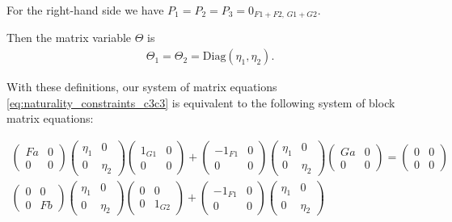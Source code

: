 \begin{example}
For the right-hand side we have $P_{1} = P_{2} = P_{3} = 0_{F1+F2,\,G1+G2}$.

Then the matrix variable $\Theta$ is
\begin{align*}
\Theta_{1} = \Theta_{2} = \mathrm{Diag}(\eta_{1}, \eta_{2}).
\end{align*}

With these definitions, our system of matrix equations \eqref{eq:naturality_constraints_c3c3} is equivalent to the following system of
block matrix equations:

\begin{subequations}
\begin{align}
\begin{pmatrix} Fa & 0 \\ 0 & 0 \end{pmatrix} \begin{pmatrix} \eta_{1} & 0 \\ 0 & \eta_{2} \end{pmatrix}
\begin{pmatrix} 1_{G1} & 0 \\ 0 & 0 \end{pmatrix}
+ \begin{pmatrix} -1_{F1} & 0 \\ 0 & 0 \end{pmatrix} \begin{pmatrix} \eta_{1} & 0 \\ 0 & \eta_{2} \end{pmatrix}
\begin{pmatrix} Ga & 0 \\ 0 & 0 \end{pmatrix} = \begin{pmatrix} 0 & 0 \\ 0 & 0 \end{pmatrix} \\
\begin{pmatrix} 0 & 0 \\ 0 & Fb \end{pmatrix} \begin{pmatrix} \eta_{1} & 0 \\ 0 & \eta_{2} \end{pmatrix}
\begin{pmatrix} 0 & 0 \\ 0 & 1_{G2} \end{pmatrix}
+ \begin{pmatrix} -1_{F1} & 0 \\ 0 & 0 \end{pmatrix} \begin{pmatrix} \eta_{1} & 0 \\ 0 & \eta_{2} \end{pmatrix}

\end{align}
\end{subequations}
\end{example}
